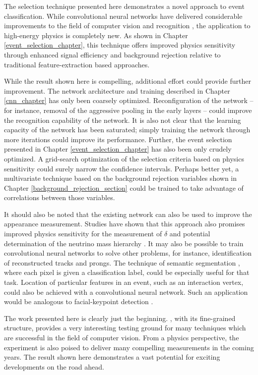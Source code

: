 The selection technique presented here demonstrates a novel approach
to event classification.
While convolutional neural networks have delivered considerable
improvements to the field of computer vision and recognition
\cite{lecun2015deep},
the application to high-energy physics is completely new.
As shown in Chapter \ref{event_selection_chapter},
this technique offers improved physics sensitivity
through enhanced signal efficiency and background rejection
relative to traditional feature-extraction based approaches.

While the result shown here is compelling, additional effort could provide
further improvement.
The network architecture and training described in Chapter \ref{cnn_chapter}
has only been coarsely optimized.
Reconfiguration of the network -- for instance, removal of the aggressive
pooling in the early layers -- could improve the recognition
capability of the network.
It is also not clear that the learning capacity of the network has
been saturated; simply training the network through more iterations
could improve its performance.
Further, the event selection presented in
Chapter \ref{event_selection_chapter}
has also been only crudely optimized.
A grid-search optimization of the selection criteria based
on physics sensitivity could surely narrow the confidence intervals.
Perhaps better yet, a multivariate technique based on the background rejection
variables shown in Chapter \ref{background_rejection_section}
could be trained to take advantage of
correlations between those variables.

It should also be noted that the existing network can also
be used to improve the \nova \nue appearance measurement.
Studies have shown that this approach also promises improved
physics sensitivity for the measurement of $\delta$
and potential determination of the
neutrino mass hierarchy \cite{radovic2015cvn}.
It may also be possible to train convolutional neural networks
to solve other problems, for instance, identification
of reconstructed tracks and prongs.
The technique of semantic segmentation \cite{long2015fully},
where each pixel is given a classification label, could be especially
useful for that task.
Location of particular features in an event, such as an interaction
vertex, could also be achieved with a convolutional neural network.
Such an application would be analogous to facial-keypoint detection
\cite{lecun2015deep}.

The work presented here is clearly just the beginning.
\nova, with its fine-grained structure, provides a very interesting
testing ground for many techniques which are successful in
the field of computer vision.
From a physics perspective, the experiment
is also poised to deliver many compelling measurements in the coming
years.
The result shown here demonstrates a
vast potential for exciting developments on the road ahead.





